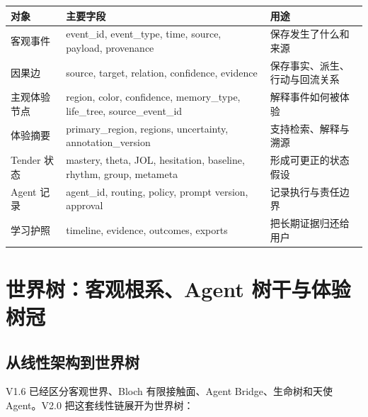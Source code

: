 \documentclass[UTF8,a4paper,11pt]{ctexart}
\begin{document}
\begin{center}
\begin{longtable}{@{}p{3.6cm}p{5.0cm}p{5.9cm}@{}}
\toprule
\textbf{对象} & \textbf{主要字段} & \textbf{用途} \\
\midrule
客观事件 & event\_id, event\_type, time, source, payload, provenance & 保存发生了什么和来源 \\
因果边 & source, target, relation, confidence, evidence & 保存事实、派生、行动与回流关系 \\
主观体验节点 & region, color, confidence, memory\_type, life\_tree, source\_event\_id & 解释事件如何被体验 \\
体验摘要 & primary\_region, regions, uncertainty, annotation\_version & 支持检索、解释与溯源 \\
Tender 状态 & mastery, theta, JOL, hesitation, baseline, rhythm, group, metameta & 形成可更正的状态假设 \\
Agent 记录 & agent\_id, routing, policy, prompt version, approval & 记录执行与责任边界 \\
学习护照 & timeline, evidence, outcomes, exports & 把长期证据归还给用户 \\
\bottomrule
\end{longtable}
\end{center}

\newpage
\section{世界树：客观根系、Agent 树干与体验树冠}

\subsection{从线性架构到世界树}

V1.6 已经区分客观世界、Bloch 有限接触面、Agent Bridge、生命树和天使 Agent。V2.0 把这套线性链展开为世界树：
\end{document}

